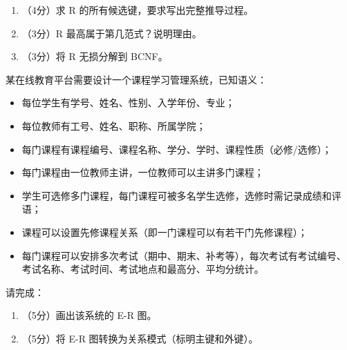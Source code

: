 \documentclass[a4paper,11pt]{article}
\begin{document}
\begin{enumerate}[leftmargin=2em, itemsep=3pt]
  \item[（1）] （4分）求 R 的所有候选键，要求写出完整推导过程。
  \item[（2）] （3分）R 最高属于第几范式？说明理由。
  \item[（3）] （3分）将 R 无损分解到 BCNF。
\end{enumerate}

\anslines{3.5cm}


\q 某在线教育平台需要设计一个课程学习管理系统，已知语义：
\begin{itemize}
  \item 每位学生有学号、姓名、性别、入学年份、专业；
  \item 每位教师有工号、姓名、职称、所属学院；
  \item 每门课程有课程编号、课程名称、学分、学时、课程性质（必修/选修）；
  \item 每门课程由一位教师主讲，一位教师可以主讲多门课程；
  \item 学生可选修多门课程，每门课程可被多名学生选修，选修时需记录成绩和评语；
  \item 课程可以设置先修课程关系（即一门课程可以有若干门先修课程）；
  \item 每门课程可以安排多次考试（期中、期末、补考等），每次考试有考试编号、考试名称、考试时间、考试地点和最高分、平均分统计。
\end{itemize}
请完成：
\begin{enumerate}[leftmargin=2em, itemsep=3pt]
  \item[（1）] （5分）画出该系统的 E-R 图。
  \item[（2）] （5分）将 E-R 图转换为关系模式（标明主键和外键）。
\end{enumerate}

\anslines{4.5cm}

\end{document}
